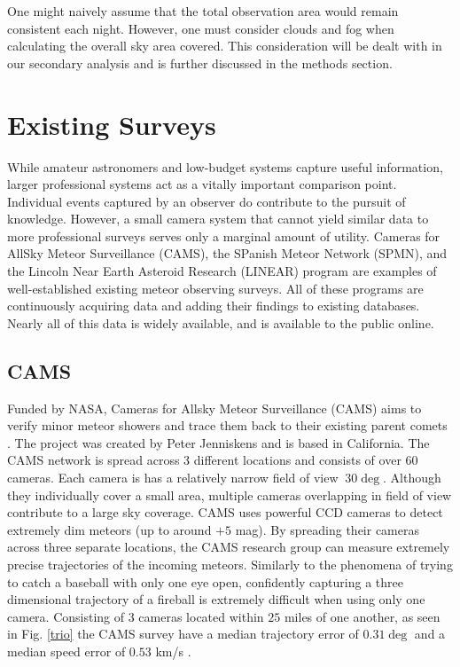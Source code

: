 One might naively assume that the total observation area would remain consistent each night.
However, one must consider clouds and fog when calculating the overall sky area covered.
This consideration will be dealt with in our secondary analysis and is further discussed in the methods section.


\section{Existing Surveys}
While amateur astronomers and low-budget systems capture useful information, larger professional systems act as a vitally important comparison point.
Individual events captured by an observer do contribute to the pursuit of knowledge.
However, a small camera system that cannot yield similar data to more professional surveys serves only a marginal amount of utility.
Cameras for AllSky Meteor Surveillance (CAMS), the SPanish Meteor Network (SPMN), and the Lincoln Near Earth Asteroid Research (LINEAR) program are examples of well-established existing meteor observing surveys.  
All of these programs are continuously acquiring data and adding their findings to existing databases.  
Nearly all of this data is widely available, and is available to the public online. 



\subsection{CAMS}
Funded by NASA, Cameras for Allsky Meteor Surveillance (CAMS) aims to verify minor meteor showers and trace them back to their existing parent comets \cite{jenniskens_cams:_2011}.  
The project was created by Peter Jenniskens and is based in California.  
The CAMS network is spread across 3 different locations and consists of over 60 cameras.
Each camera is has a relatively narrow field of view $~30\deg$.
Although they individually cover a small area, multiple cameras overlapping in field of view contribute to a large sky coverage. 
CAMS uses powerful CCD cameras to detect extremely dim meteors (up to around $+5$ mag).
By spreading their cameras across three separate locations, the CAMS research group can measure extremely precise trajectories of the incoming meteors. 
Similarly to the phenomena of trying to catch a baseball with only one eye open, confidently capturing a three dimensional trajectory of a fireball is extremely difficult when using only one camera.
Consisting of $3$ cameras located within $25$ miles of one another, as seen in Fig. \ref{trio} the CAMS survey have a median trajectory error of $0.31\deg$ and a median speed error of $0.53$ km/s \cite{jenniskens_cams:_2011}. 

